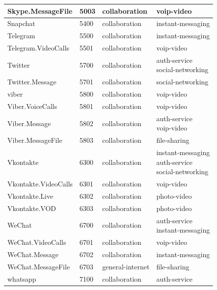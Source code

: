 \begin{longtable}{p{}|p{}|p{}|p{}}
    Skype.MessageFile &	5003 &	collaboration &	voip-video \\ \hline
    Snapchat &	5400 &	collaboration &	instant-messaging \\ \hline
    Telegram &	5500 &	collaboration &	instant-messaging \\ \hline
    Telegram.VideoCalls &	5501 &	collaboration &	voip-video \\ \hline
    Twitter &	5700 &	collaboration &	\tabincell{l}{auth-service\\
                                                      social-networking} \\ \hline
    Twitter.Message &	5701 &	collaboration &	social-networking \\ \hline
    viber &	5800 &	collaboration &	voip-video \\ \hline
    Viber.VoiceCalls &	5801 &	collaboration &	voip-video \\ \hline
    Viber.Message &	5802 &	collaboration &	\tabincell{l}{auth-service\\
                                                          voip-video} \\ \hline
    Viber.MessageFile &	5803 &	collaboration &	file-sharing \\ \hline
    Vkontakte &	6300 &	collaboration &	\tabincell{l}{instant-messaging\\
                                                      auth-service\\
                                                      social-networking} \\ \hline
    Vkontakte.VideoCalls &	6301 &	collaboration &	voip-video \\ \hline
    Vkontakte.Live &	6302 &	collaboration &	photo-video \\ \hline
    Vkontakte.VOD &	6303 &	collaboration &	photo-video \\ \hline
    WeChat &	6700 &	collaboration &	\tabincell{l}{auth-service\\
                                                      instant-messaging} \\ \hline
    WeChat.VideoCalls &	6701 &	collaboration &	voip-video \\ \hline
    WeChat.Message &	6702 &	collaboration &	instant-messaging \\ \hline
    WeChat.MessageFile &	6703 &	general-internet &	file-sharing \\ \hline
    whatsapp &	7100 &	collaboration &	\tabincell{l}{auth-service\\
}
\end{longtable}
